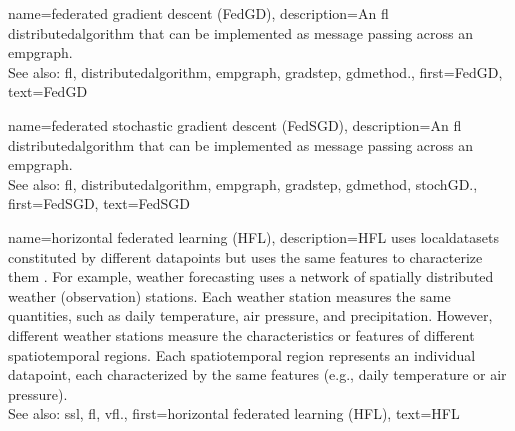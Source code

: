{name={federated gradient descent (FedGD)},
	description={An \gls{fl} \gls{distributedalgorithm} that 
		can be implemented as message passing across an \gls{empgraph}. 
		\\ 
		See also: \gls{fl}, \gls{distributedalgorithm}, \gls{empgraph}, \gls{gradstep}, \gls{gdmethod}.},
	first={FedGD},
	text={FedGD}
} 

{name={federated stochastic gradient descent (FedSGD)},
	description={An \gls{fl} \gls{distributedalgorithm} that 
		can be implemented as message passing across an \gls{empgraph}. 
		\\ 
		See also: \gls{fl}, \gls{distributedalgorithm}, \gls{empgraph}, \gls{gradstep}, \gls{gdmethod}, \gls{stochGD}.},
	first={FedSGD},
	text={FedSGD}
} 

{name={horizontal federated learning (HFL)},
	description={HFL uses \glspl{localdataset} constitut\-ed by different
	   	\glspl{datapoint} but uses the same \glspl{feature} to characterize them \cite{HFLChapter2020}.
		For example, weather forecasting uses a network of spatially distributed
		weather (observation) stations. Each weather station measures the
		same quantities, such as daily temperature, air pressure, and precipitation.
		However, different weather stations measure the characteristics or
		\glspl{feature} of different spatiotemporal regions. Each spatiotemporal region 
		represents an individual \gls{datapoint}, each characterized by the same \glspl{feature} 
		(e.g., daily temperature or air pressure).\\
		See also: \gls{ssl}, \gls{fl}, \gls{vfl}.},
	first={horizontal federated learning (HFL)},
	text={HFL}
} 


